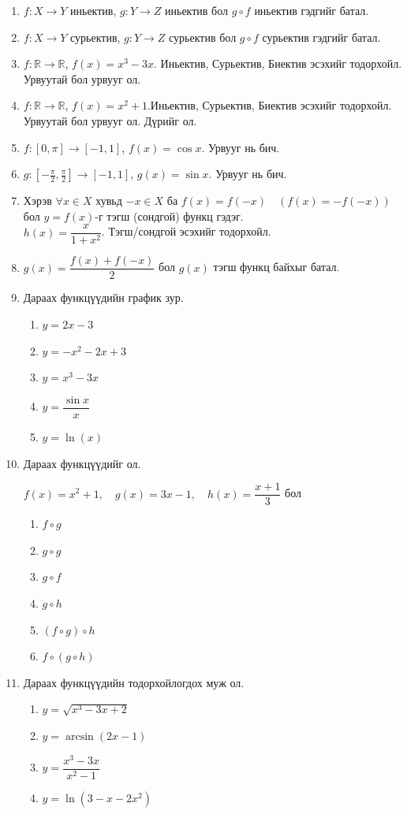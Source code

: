 \begin{enumerate}
  в) биектив  буулгалтын жишээ болох график зур.
  \item $f:X\to Y$ иньектив, $g:Y\to Z$ иньектив бол $g\circ f$ иньектив гэдгийг батал.
  \item $f:X\to Y$ сурьектив, $g:Y\to Z$ сурьектив бол $g\circ f$ сурьектив гэдгийг батал.
  \item $f:\mathbb{R}\to\mathbb{R}$, $f(x)=x^3-3x$. Иньектив, Сурьектив, Биектив эсэхийг тодорхойл. Урвуутай бол урвууг ол.
  \item $f:\mathbb{R}\to\mathbb{R}$, $f(x)=x^2+1$.Иньектив, Сурьектив, Биектив эсэхийг тодорхойл. Урвуутай бол урвууг ол. Дүрийг ол.
  \item $f:[0,\pi]\to[-1,1]$, $f(x)=\cos x$. Урвууг нь бич.
  \item $g:[-\tfrac{\pi}{2},\tfrac{\pi}{2}]\to[-1,1]$, $g(x)=\sin x$. Урвууг нь бич.
  \item Хэрэв $\forall x\in X$ хувьд $-x\in X$ ба $f(x)=f(-x) \quad (f(x)=-f(-x) )$ бол $y=f(x)$-г тэгш (сондгой) функц гэдэг. \\
  $h(x)=\dfrac{x}{1+x^2}$. Тэгш/сондгой эсэхийг тодорхойл.
  \item $g(x)=\dfrac{f(x)+f(-x)}{2}$ бол $g(x)$ тэгш функц байхыг батал.
  \item Дараах функцүүдийн график зур.
  \begin{enumerate}
    \item $y=2x-3$
    \item $y=-x^2-2x+3$
    \item $y=x^3-3x$         
    \item $y=\dfrac{\sin x}{x}$
    \item $y=\ln(x)$
  \end{enumerate}
  \item Дараах функцүүдийг ол.

  $f(x)=x^2+1,\quad g(x)=3x-1, \quad h(x)=\dfrac{x+1}{3}$ бол 
  \begin{enumerate}
      \item $f\circ g$
      \item $g\circ g$
      \item $g\circ f$
      \item $g\circ h$
      \item $(f\circ g)\circ h$
      \item $f\circ (g\circ h)$
  \end{enumerate}
  \item Дараах функцүүдийн тодорхойлогдох муж ол.
  \begin{enumerate}
      \item $y=\sqrt{x^3-3x+2}$
      \item $y=\arcsin(2x-1)$
      \item $y=\dfrac{x^3-3x}{x^2-1}$
      \item $y=\ln(3-x-2x^2)$
  \end{enumerate}
\end{enumerate}

